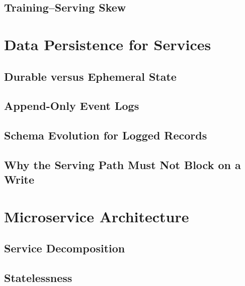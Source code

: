 \subsection{Training--Serving Skew}

\section{Data Persistence for Services}
\label{sec:persistence}


\subsection{Durable versus Ephemeral State}

\subsection{Append-Only Event Logs}

\subsection{Schema Evolution for Logged Records}

\subsection{Why the Serving Path Must Not Block on a Write}

\section{Microservice Architecture}
\label{sec:microservices}

\subsection{Service Decomposition}

\subsection{Statelessness}

